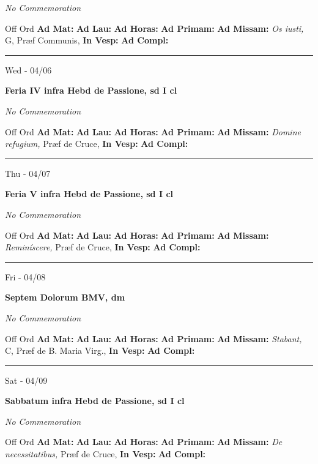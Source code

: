 \documentclass[letterpaper, 10pt]{article}
\begin{document}
\textit{No Commemoration}\begin{justify}
Off Ord
\textbf{Ad Mat: }
\textbf{Ad Lau: }
\textbf{Ad Horas: }
\textbf{Ad Primam: }
\textbf{Ad Missam:} \textit{Os iusti, } G, Præf Communis, 
\textbf{In Vesp: }
\textbf{Ad Compl: }\end{justify}



\hrule
\begin{center}
Wed - 04/06
\end{center}\textbf{ \large Feria IV infra Hebd de Passione, \textnormal{\normalsize sd I cl}}

\textit{No Commemoration}\begin{justify}
Off Ord
\textbf{Ad Mat: }
\textbf{Ad Lau: }
\textbf{Ad Horas: }
\textbf{Ad Primam: }
\textbf{Ad Missam:} \textit{Domine refugium, } Præf de Cruce, 
\textbf{In Vesp: }
\textbf{Ad Compl: }\end{justify}



\hrule
\begin{center}
Thu - 04/07
\end{center}\textbf{ \large Feria V infra Hebd de Passione, \textnormal{\normalsize sd I cl}}

\textit{No Commemoration}\begin{justify}
Off Ord
\textbf{Ad Mat: }
\textbf{Ad Lau: }
\textbf{Ad Horas: }
\textbf{Ad Primam: }
\textbf{Ad Missam:} \textit{Reminíscere, } Præf de Cruce, 
\textbf{In Vesp: }
\textbf{Ad Compl: }\end{justify}



\hrule
\begin{center}
Fri - 04/08
\end{center}\textbf{ \large Septem Dolorum BMV, \textnormal{\normalsize dm}}

\textit{No Commemoration}\begin{justify}
Off Ord
\textbf{Ad Mat: }
\textbf{Ad Lau: }
\textbf{Ad Horas: }
\textbf{Ad Primam: }
\textbf{Ad Missam:} \textit{Stabant, } C, Præf de B. Maria Virg., 
\textbf{In Vesp: }
\textbf{Ad Compl: }\end{justify}



\hrule
\begin{center}
Sat - 04/09
\end{center}\textbf{ \large Sabbatum infra Hebd de Passione, \textnormal{\normalsize sd I cl}}

\textit{No Commemoration}\begin{justify}
Off Ord
\textbf{Ad Mat: }
\textbf{Ad Lau: }
\textbf{Ad Horas: }
\textbf{Ad Primam: }
\textbf{Ad Missam:} \textit{De necessitatibus, } Præf de Cruce, 
\textbf{In Vesp: }
\textbf{Ad Compl: }\end{justify}
\end{document}
